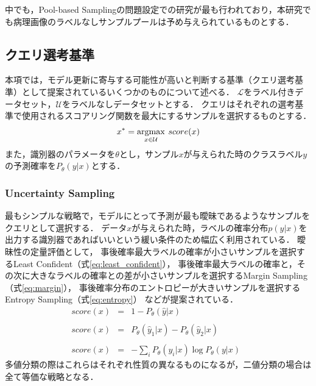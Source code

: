 中でも，Pool-based Samplingの問題設定での研究が最も行われており，本研究でも病理画像のラベルなしサンプルプールは予め与えられているものとする．

\subsection{クエリ選考基準}
\label{query_strategy}
本項では，モデル更新に寄与する可能性が高いと判断する基準（クエリ選考基準）として提案されているいくつかのものについて述べる．
$\mathcal{L}$をラベル付きデータセット，$\mathcal{U}$をラベルなしデータセットとする．
クエリはそれぞれの選考基準で使用されるスコアリング関数を最大にするサンプルを選択するものとする．
\begin{eqnarray}
    x^{*} = \argmax_{x \in \mathcal{U}} \: score(x)
\end{eqnarray}
また，識別器のパラメータを$\theta$とし，サンプル$x$が与えられた時のクラスラベル$y$の予測確率を$P_{\theta}(y|x)$とする．

\subsubsection{Uncertainty Sampling \cite{lewis1994sequential}} 
最もシンプルな戦略で，モデルにとって予測が最も曖昧であるようなサンプルをクエリとして選択する．
データ$x$が与えられた時，ラベルの確率分布$p(y|x)$を出力する識別器であればいいという緩い条件のため幅広く利用されている．
曖昧性の定量評価として，
事後確率最大ラベルの確率が小さいサンプルを選択するLeast Confident（式\ref{eq:least_confident}），
事後確率最大ラベルの確率と，その次に大きなラベルの確率との差が小さいサンプルを選択するMargin Sampling（式\ref{eq:margin}），
事後確率分布のエントロピーが大きいサンプルを選択するEntropy Sampling（式\ref{eq:entropy}）
などが提案されている．
\begin{eqnarray}
    score(x) &=& 1 - P_{\theta}(\hat{y}|x)  \;\;  \label{eq:least_confident} \\ \nonumber \\ 
    score(x) &=& P_{\theta}(\hat{y}_1|x) - P_{\theta}(\hat{y}_2|x)  \;\;  \label{eq:margin}\\ \nonumber \\
    score(x) &=& - \sum_i {P_{\theta}(y_i|x)} \log P_{\theta}(y|x)  \;\;  \label{eq:entropy}
\end{eqnarray}
多値分類の際はこれらはそれぞれ性質の異なるものになるが，二値分類の場合は全て等価な戦略となる．

